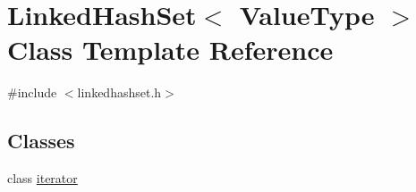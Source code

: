 \hypertarget{classLinkedHashSet}{}\section{Linked\+Hash\+Set$<$ Value\+Type $>$ Class Template Reference}
\label{classLinkedHashSet}


{\ttfamily \#include $<$linkedhashset.\+h$>$}

\subsection*{Classes}
\begin{DoxyCompactItemize}
\item 
class \mbox{\hyperlink{classLinkedHashSet_1_1iterator}{iterator}}
\end{DoxyCompactItemize}
